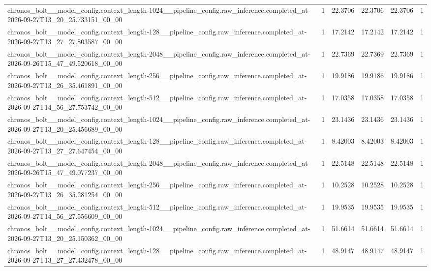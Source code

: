 \begin{tabular}{llllll}
chronos\_bolt\_\_model\_config.context\_length-1024\_\_pipeline\_config.raw\_inference.completed\_at-2026-09-27T13\_20\_25.733151\_00\_00 & 1 & 22.3706 & 22.3706 & 22.3706 & 1 \\
chronos\_bolt\_\_model\_config.context\_length-128\_\_pipeline\_config.raw\_inference.completed\_at-2026-09-27T13\_27\_27.803587\_00\_00 & 1 & 17.2142 & 17.2142 & 17.2142 & 1 \\
chronos\_bolt\_\_model\_config.context\_length-2048\_\_pipeline\_config.raw\_inference.completed\_at-2026-09-26T15\_47\_49.520618\_00\_00 & 1 & 22.7369 & 22.7369 & 22.7369 & 1 \\
chronos\_bolt\_\_model\_config.context\_length-256\_\_pipeline\_config.raw\_inference.completed\_at-2026-09-27T13\_26\_35.461891\_00\_00 & 1 & 19.9186 & 19.9186 & 19.9186 & 1 \\
chronos\_bolt\_\_model\_config.context\_length-512\_\_pipeline\_config.raw\_inference.completed\_at-2026-09-27T14\_56\_27.753742\_00\_00 & 1 & 17.0358 & 17.0358 & 17.0358 & 1 \\
chronos\_bolt\_\_model\_config.context\_length-1024\_\_pipeline\_config.raw\_inference.completed\_at-2026-09-27T13\_20\_25.456689\_00\_00 & 1 & 23.1436 & 23.1436 & 23.1436 & 1 \\
chronos\_bolt\_\_model\_config.context\_length-128\_\_pipeline\_config.raw\_inference.completed\_at-2026-09-27T13\_27\_27.647454\_00\_00 & 1 & 8.42003 & 8.42003 & 8.42003 & 1 \\
chronos\_bolt\_\_model\_config.context\_length-2048\_\_pipeline\_config.raw\_inference.completed\_at-2026-09-26T15\_47\_49.077237\_00\_00 & 1 & 22.5148 & 22.5148 & 22.5148 & 1 \\
chronos\_bolt\_\_model\_config.context\_length-256\_\_pipeline\_config.raw\_inference.completed\_at-2026-09-27T13\_26\_35.281254\_00\_00 & 1 & 10.2528 & 10.2528 & 10.2528 & 1 \\
chronos\_bolt\_\_model\_config.context\_length-512\_\_pipeline\_config.raw\_inference.completed\_at-2026-09-27T14\_56\_27.556609\_00\_00 & 1 & 19.9535 & 19.9535 & 19.9535 & 1 \\
chronos\_bolt\_\_model\_config.context\_length-1024\_\_pipeline\_config.raw\_inference.completed\_at-2026-09-27T13\_20\_25.150362\_00\_00 & 1 & 51.6614 & 51.6614 & 51.6614 & 1 \\
chronos\_bolt\_\_model\_config.context\_length-128\_\_pipeline\_config.raw\_inference.completed\_at-2026-09-27T13\_27\_27.432478\_00\_00 & 1 & 48.9147 & 48.9147 & 48.9147 & 1 \\

\end{tabular}
